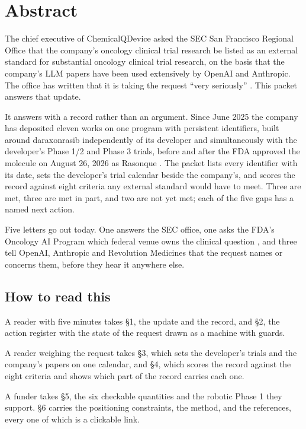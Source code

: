 \section*{Abstract}

The chief executive of ChemicalQDevice asked the SEC San Francisco Regional
Office that the company's oncology clinical trial research be listed as an
external standard for substantial oncology clinical trial research, on the basis
that the company's LLM papers have been used extensively by OpenAI and
Anthropic. The office has written that it is taking the request ``very
seriously'' \cite{secsf2026}. This packet answers that update.

It answers with a record rather than an argument. Since June 2025 the company
has deposited eleven works on one program with persistent identifiers, built
around daraxonrasib independently of its developer and simultaneously with the
developer's Phase 1/2 and Phase 3 trials, before and after the FDA approved the
molecule on August 26, 2026 as Rasonque \cite{fdarasonque2026,ctgov001,ctgov302}.
The packet lists every identifier with its date, sets the developer's trial
calendar beside the company's, and scores the record against eight criteria any
external standard would have to meet. Three are met, three are met in part, and
two are not yet met; each of the five gaps has a named next action.

Five letters go out today. One answers the SEC office, one asks the FDA's
Oncology AI Program which federal venue owns the clinical question
\cite{fdaoceai2026}, and three tell OpenAI, Anthropic and Revolution Medicines
that the request names or concerns them, before they hear it anywhere else.

\subsection*{How to read this}

A reader with five minutes takes \S1, the update and the record, and \S2, the
action register with the state of the request drawn as a machine with guards.

A reader weighing the request takes \S3, which sets the developer's trials and
the company's papers on one calendar, and \S4, which scores the record against
the eight criteria and shows which part of the record carries each one.

A funder takes \S5, the six checkable quantities and the robotic Phase 1 they
support. \S6 carries the positioning constraints, the method, and the
references, every one of which is a clickable link.
